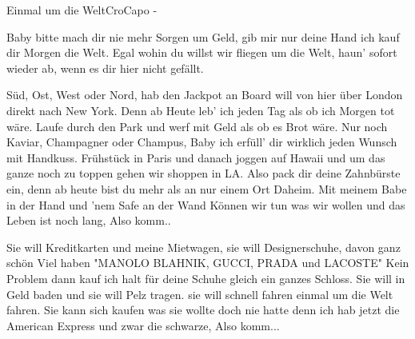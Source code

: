 \begin{song}{Einmal um die Welt}{Cro}{Capo -}


Baby bitte mach dir nie mehr Sorgen um Geld,
gib mir nur deine Hand ich kauf dir Morgen die Welt.
Egal wohin du willst wir fliegen um die Welt,
haun' sofort wieder ab, wenn es dir hier nicht gefällt.

Süd, Ost, West oder Nord, hab den Jackpot an Board
will von hier über London direkt nach New York.
Denn ab Heute leb' ich jeden Tag als ob ich Morgen tot wäre.
Laufe durch den Park und werf mit Geld als ob es Brot wäre.
Nur noch Kaviar, Champagner oder Champus,
Baby ich erfüll' dir wirklich jeden Wunsch mit Handkuss.
Frühstück in Paris und danach joggen auf Hawaii
und um das ganze noch zu toppen gehen wir shoppen in LA.
Also pack dir deine Zahnbürste ein,
denn ab heute bist du mehr als an nur einem Ort Daheim.
Mit meinem Babe in der Hand und 'nem Safe an der Wand
Können wir tun was wir wollen und das Leben ist noch lang,
Also komm..


Sie will Kreditkarten und meine Mietwagen,
sie will Designerschuhe, davon ganz schön Viel haben
"MANOLO BLAHNIK, GUCCI, PRADA und LACOSTE"
Kein Problem dann kauf ich halt für deine Schuhe gleich ein ganzes Schloss.
Sie will in Geld baden und sie will Pelz tragen.
sie will schnell fahren einmal um die Welt fahren.
Sie kann sich kaufen was sie wollte doch nie hatte
denn ich hab jetzt die American Express und zwar die schwarze,
Also komm...

\end{song}
